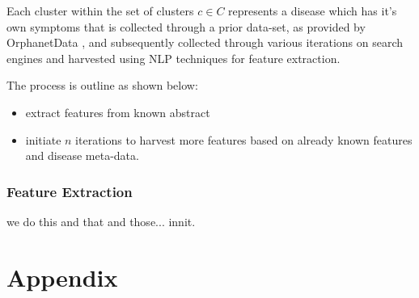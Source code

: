 \documentclass[10pt,letterpaper,final]{article}
\begin{document}
Each cluster within the set of clusters $c \in C$ represents a disease
which has it's own symptoms that is collected through a prior data-set,
as provided by OrphanetData , and subsequently
collected through various iterations on search engines and harvested
using NLP techniques for feature extraction.

The process is outline as shown below:
\begin{itemize}
\item extract features from known abstract
\item initiate $n$ iterations to harvest more features based on already
known features and disease meta-data.
\end{itemize}


\subsubsection{Feature Extraction}
we do this and that and those... innit.




\appendix
\section{Appendix}

\renewcommand\bibname{References}


\end{document}
